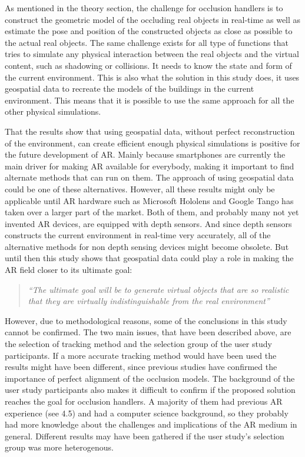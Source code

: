 As mentioned in the theory section, the challenge for occlusion handlers is to  construct the geometric model of the occluding real objects in real-time as well as estimate the pose and position of the constructed objects as close as possible to the actual real objects. The same challenge exists for all type of functions that tries to simulate any physical interaction between the real objects and the virtual content, such as shadowing or collisions. It needs to know the state and form of the current environment. This is also what the solution in this study does, it uses geospatial data to recreate the models of the buildings in the current environment. This means that it is possible to use the same approach for all the other physical simulations.

That the results show that using geospatial data, without perfect reconstruction of the environment, can create efficient enough physical simulations is positive for the future development of AR. Mainly because smartphones are currently the main driver for making AR available for everybody, making it important to find alternate methods that can run on them. The approach of using geospatial data could be one of these alternatives. However, all these results might only be applicable until AR hardware such as Microsoft Hololens and Google Tango has taken over a larger part of the market. Both of them, and probably many not yet invented AR devices, are equipped with depth sensors. And since depth sensors constructs the current environment in real-time very accurately, all of the alternative methods for non depth sensing devices might become obsolete. But until then this study shows that geospatial data could play a role in making the AR field closer to its ultimate goal: 

\begin{quote}
\textit{``The ultimate goal will be to generate virtual objects that are so realistic that they are virtually indistinguishable from the real environment''} \cite{azuma1997survey}
\end{quote} 

However, due to methodological reasons, some of the conclusions in this study cannot be confirmed. The two main issues, that have been described above, are the selection of tracking method and the selection group of the user study participants. If a more accurate tracking method would have been used the results might have been different, since previous studies have confirmed the importance of perfect alignment of the occlusion models. The background of the user study participants also makes it difficult to confirm if the proposed solution reaches the goal for occlusion handlers. A majority of them had previous AR experience (see 4.5) and had a computer science background, so they probably had more knowledge about the challenges and implications of the AR medium in general. Different results may have been gathered if the user study's selection group was more heterogenous.

